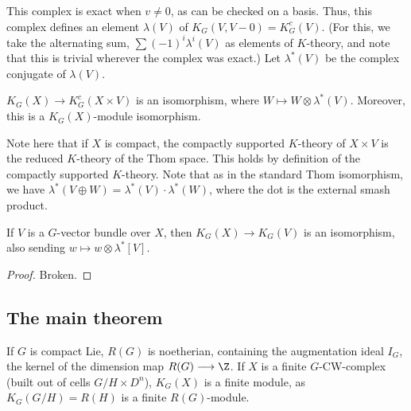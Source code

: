 \documentclass[11pt]{article}
\begin{document}
\begin{GuozhenEqKthy}
This complex is exact when $v\neq 0$, as can be checked on a basis. Thus, this complex defines an element $\lambda(V)$ of $K_G(V,V-0)=K^c_G(V)$. (For this, we take the alternating sum, $\sum (-1)^i \lambda^i(V)$ as elements of $K$-theory, and note that this is trivial wherever the complex was exact.)
Let $\lambda^*(V)$ be the complex conjugate of $\lambda(V)$.
\begin{thm*}
$K_G(X)\to K_G^c(X\times V)$ is an isomorphism, where $W\mapsto W\otimes\lambda^*(V)$. Moreover, this is a $K_G(X)$-module isomorphism.
\end{thm*}
\noindent Note here that if $X$ is compact, the compactly supported $K$-theory of $X\times V$ is the reduced $K$-theory of the Thom space. This holds by definition of the compactly supported $K$-theory. Note that as in the standard Thom isomorphism, we have $\lambda^*(V\oplus W)=\lambda^*(V)\cdot\lambda^*(W)$, where the dot is the external smash product.
\begin{cor*}
If $V$ is a $G$-vector bundle over $X$, then $K_G(X)\to K_G(V)$ is an isomorphism, also sending $w\mapsto w\otimes \lambda^*[V]$.
\end{cor*}
\begin{proof}Broken.
\end{proof}
\subsection*{The main theorem}
If $G$ is compact Lie, $R(G)$ is noetherian, containing the augmentation ideal $I_G$, the kernel of the dimension map $R(G)\to\Z$. If $X$ is a finite  $G$-CW-complex (built out of cells $G/H\times D^n$), $K_G(X)$ is a finite module, as $K_G(G/H)=R(H)$ is a finite $R(G)$-module.


\end{GuozhenEqKthy}
\end{document}
